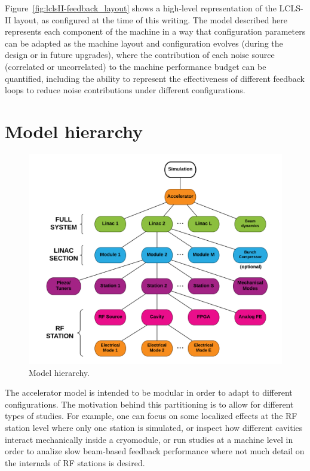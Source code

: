 \documentclass[a4paper,12pt]{article}
\begin{document}
Figure~\ref{fig:lclsII-feedback_layout} shows a high-level representation of the LCLS-II layout, as configured at the time of this writing. The model described here represents each component of the machine in a way that configuration parameters can be adapted as the machine layout and configuration evolves (during the design or in future upgrades), where the contribution of each noise source (correlated or uncorrelated) to the machine performance budget can be quantified, including the ability to represent the effectiveness of different feedback loops to reduce noise contributions under different configurations. 

\section{Model hierarchy}

\begin{figure}
\centering
\includegraphics[scale=0.18]{../figures/Model_hierarchy.png}
\caption{Model hierarchy.}
\label{fig:model_hierarchy}
\end{figure}

The accelerator model is intended to be modular in order to adapt to different configurations. The motivation behind this partitioning is to allow for different types of studies. For example, one can focus on some localized effects at the RF station level where only one station is simulated, or inspect how different cavities interact mechanically inside a cryomodule, or run studies at a machine level in order to analize slow beam-based feedback performance where not much detail on the internals of RF stations is desired.
\end{document}
